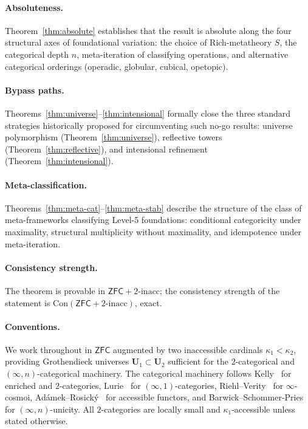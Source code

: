 \documentclass[11pt]{article}
\theoremstyle{plain}
\theoremstyle{definition}
\newcommand{\Con}{\mathrm{Con}}
\newcommand{\ZFC}{\mathsf{ZFC}}
\begin{document}
\paragraph{Absoluteness.} Theorem~\ref{thm:absolute} establishes that the result is absolute along the four structural axes of foundational variation: the choice of Rich-metatheory $S$, the categorical depth $n$, meta-iteration of classifying operations, and alternative categorical orderings (operadic, globular, cubical, opetopic).

\paragraph{Bypass paths.} Theorems~\ref{thm:universe}--\ref{thm:intensional} formally close the three standard strategies historically proposed for circumventing such no-go results: universe polymorphism (Theorem~\ref{thm:universe}), reflective towers (Theorem~\ref{thm:reflective}), and intensional refinement (Theorem~\ref{thm:intensional}).

\paragraph{Meta-classification.} Theorems~\ref{thm:meta-cat}--\ref{thm:meta-stab} describe the structure of the class of meta-frameworks classifying Level-5 foundations: conditional categoricity under maximality, structural multiplicity without maximality, and idempotence under meta-iteration.

\paragraph{Consistency strength.} The theorem is provable in $\ZFC + 2\text{-inacc}$; the consistency strength of the statement is $\Con(\ZFC + 2\text{-inacc})$, exact.

\paragraph{Conventions.} We work throughout in $\ZFC$ augmented by two inaccessible cardinals $\kappa_1 < \kappa_2$, providing Grothendieck universes $\mathbf{U}_1 \subset \mathbf{U}_2$ sufficient for the $2$-categorical and $(\infty, n)$-categorical machinery. The categorical machinery follows Kelly~\cite{Kelly1982} for enriched and $2$-categories, Lurie~\cite{LurieHTT, LurieHA} for $(\infty, 1)$-categories, Riehl--Verity~\cite{RiehlVerity2022} for $\infty$-cosmoi, Ad\'amek--Rosick\'y~\cite{AdamekRosicky1994} for accessible functors, and Barwick--Schommer-Pries~\cite{BarwickSchommerPries2021} for $(\infty, n)$-unicity. All $2$-categories are locally small and $\kappa_1$-accessible unless stated otherwise.
\end{document}
